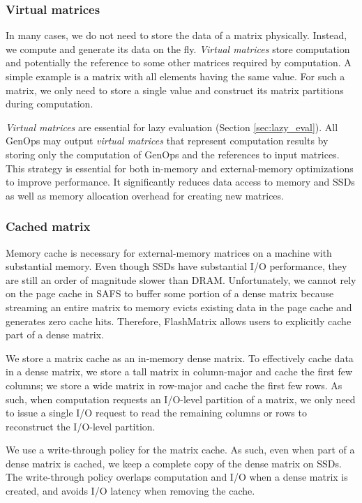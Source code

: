 \subsubsection{Virtual matrices} \label{virt_mat}
In many cases, we do not need to store the data of a matrix physically. Instead,
we compute and generate its data on the fly. \textit{Virtual matrices} store
computation and potentially the reference
to some other matrices required by computation. A simple example is a matrix
with all elements having the same value. For such a matrix, we only need to store
a single value and construct its matrix partitions during computation.

\textit{Virtual matrices} are essential for lazy evaluation (Section
\ref{sec:lazy_eval}). All GenOps may output \textit{virtual matrices} that
represent computation results by storing only the computation of GenOps
and the references to input matrices. This strategy is
essential for both in-memory and external-memory optimizations to improve
performance. It significantly reduces data access to memory and SSDs as well as
memory allocation overhead for creating new matrices.

\subsubsection{Cached matrix}
Memory cache is necessary for external-memory matrices on a machine with
substantial memory.
Even though SSDs have substantial I/O performance, they are still
an order of magnitude slower than DRAM. Unfortunately, we cannot rely on
the page cache in SAFS \cite{sa-cache} to buffer some portion of a dense matrix
because streaming an entire matrix to memory evicts existing data in the page
cache and generates zero cache hits. Therefore, FlashMatrix allows users to
explicitly cache part of a dense matrix.

We store a matrix cache as an in-memory dense matrix.
To effectively cache data in a dense matrix, we store a tall matrix in
column-major and cache the first few columns; we store a wide matrix in row-major
and cache the first few rows. As such, when computation requests an I/O-level
partition of a matrix, we only need to issue a single I/O request to read
the remaining columns or rows to reconstruct the I/O-level partition.

We use a write-through policy for the matrix cache. As such, even when part of
a dense matrix is cached, we keep a complete copy of the dense matrix on SSDs.
The write-through policy overlaps computation and I/O when
a dense matrix is created, and avoids I/O latency when removing the cache.

